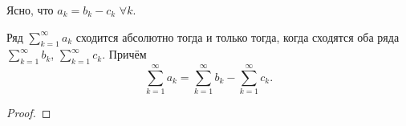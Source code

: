\documentclass[../../main.tex]{subfiles}
\begin{document}
	Ясно, что $a_k = b_k - c_k$ $\forall k$.
	
	\begin{thm}
		Ряд $\sum\limits_{k = 1}^\infty a_k$ сходится абсолютно тогда и только тогда, когда сходятся оба ряда $\sum\limits_{k = 1}^\infty b_k$, $\sum\limits_{k = 1}^\infty c_k$. Причём
		\begin{equation}
			\sum_{k = 1}^\infty a_k = \sum_{k = 1}^\infty b_k - \sum_{k = 1}^\infty c_k.
			\label{29:11}
		\end{equation}
	\end{thm}
	\begin{proof}
		
	\end{proof}
\end{document}
